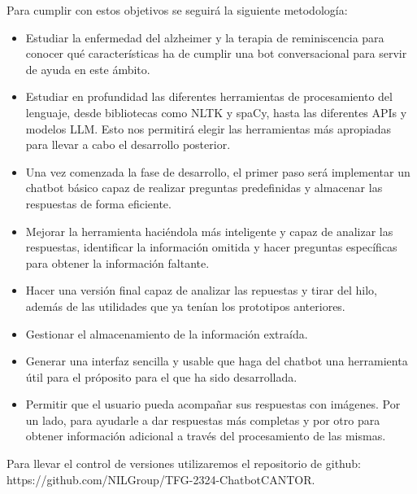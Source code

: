 Para cumplir con estos objetivos se seguirá la siguiente metodología: 

 \begin{itemize}
 
\item Estudiar la enfermedad del alzheimer y la terapia de reminiscencia para conocer qué características ha de cumplir una bot conversacional para servir de ayuda en este ámbito. 

\item Estudiar en profundidad las diferentes herramientas de procesamiento del lenguaje, desde bibliotecas como NLTK y spaCy, hasta las diferentes APIs y modelos LLM. Esto nos permitirá elegir las herramientas más apropiadas para llevar a cabo el desarrollo posterior.  

\item Una vez comenzada la fase de desarrollo, el primer paso será implementar un chatbot básico capaz de realizar preguntas predefinidas y almacenar las respuestas de forma eficiente.
 
\item Mejorar la herramienta haciéndola más inteligente y capaz de analizar las respuestas, identificar la información omitida y hacer preguntas específicas para obtener la información faltante.
 
\item Hacer una versión final capaz de analizar las repuestas y tirar del hilo, además de las utilidades que ya tenían los prototipos anteriores.

\item Gestionar el almacenamiento de la información extraída.  

\item Generar una interfaz sencilla y usable que haga del chatbot una herramienta útil para el próposito para el que ha sido desarrollada.

\item Permitir que el usuario pueda acompañar sus respuestas con imágenes. Por un lado, para ayudarle a dar respuestas más completas y por otro para obtener información adicional a través del procesamiento de las mismas.  
\end{itemize}

Para llevar el control de versiones utilizaremos el repositorio de github:\\
 https://github.com/NILGroup/TFG-2324-ChatbotCANTOR. 

